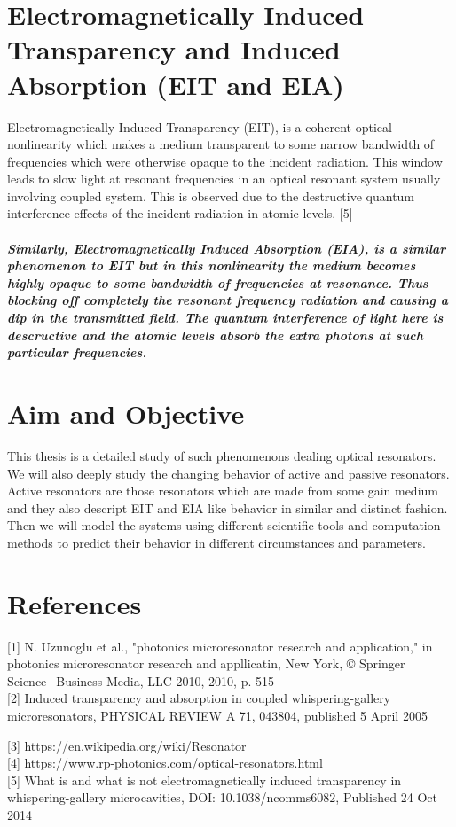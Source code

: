 \newpage

\section{Electromagnetically Induced Transparency and Induced Absorption (EIT and EIA)}
Electromagnetically Induced Transparency (EIT), is a coherent optical nonlinearity which makes a medium transparent to some narrow bandwidth of frequencies which were otherwise opaque to the incident radiation. This window leads to slow light at resonant frequencies in an optical resonant system usually involving coupled system. This is observed due to the destructive quantum interference effects of the incident radiation in atomic levels. [5]

\subparagraph{\normalfont \large Similarly, Electromagnetically Induced Absorption (EIA), is a similar phenomenon to EIT but in this nonlinearity the medium becomes highly opaque to some bandwidth of frequencies at resonance. Thus blocking off completely the resonant frequency radiation and causing a dip in the transmitted field. The quantum interference of light here is descructive and the atomic levels absorb the extra photons at such particular frequencies. }

\newpage
\section{Aim and Objective}
This thesis is a detailed study of such phenomenons dealing optical resonators. We will also deeply study the changing behavior of active and passive resonators. Active resonators are those resonators which are made from some gain medium and they also descript EIT and EIA like behavior in similar and distinct fashion. Then we will model the systems using different scientific tools and computation methods to predict their behavior in different circumstances and parameters. 


\newpage
\section*{References}

[1]  N. Uzunoglu et al., "photonics microresonator research and application," in photonics
microresonator research and appllicatin, New York, © Springer Science+Business Media,
LLC 2010, 2010, p. 515 \\ 

[2] Induced transparency and absorption in coupled whispering-gallery microresonators, PHYSICAL REVIEW A 71, 043804, published 5 April 2005

[3] https://en.wikipedia.org/wiki/Resonator \\

[4] https://www.rp-photonics.com/optical-resonators.html \\

[5] What is and what is not electromagnetically
induced transparency in whispering-gallery
microcavities, DOI: 10.1038/ncomms6082, Published 24 Oct 2014 \\